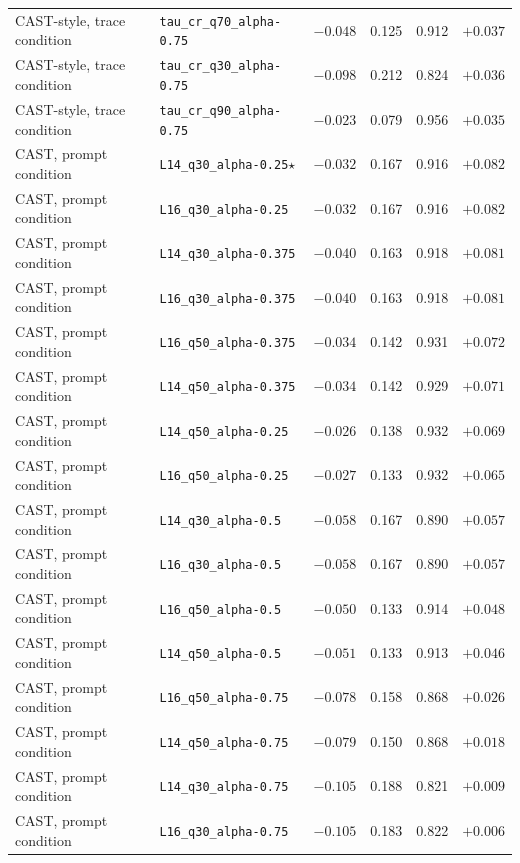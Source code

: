 {\begin{longtable}{l|l|c|cc|c}
CAST-style, trace condition & \texttt{tau\_cr\_q70\_alpha-0.75} & $-0.048$ & 0.125 & 0.912 & $+0.037$ \\
CAST-style, trace condition & \texttt{tau\_cr\_q30\_alpha-0.75} & $-0.098$ & 0.212 & 0.824 & $+0.036$ \\
CAST-style, trace condition & \texttt{tau\_cr\_q90\_alpha-0.75} & $-0.023$ & 0.079 & 0.956 & $+0.035$ \\
CAST, prompt condition & \texttt{L14\_q30\_alpha-0.25}$\star$ & $-0.032$ & 0.167 & 0.916 & $+0.082$ \\
CAST, prompt condition & \texttt{L16\_q30\_alpha-0.25} & $-0.032$ & 0.167 & 0.916 & $+0.082$ \\
CAST, prompt condition & \texttt{L14\_q30\_alpha-0.375} & $-0.040$ & 0.163 & 0.918 & $+0.081$ \\
CAST, prompt condition & \texttt{L16\_q30\_alpha-0.375} & $-0.040$ & 0.163 & 0.918 & $+0.081$ \\
CAST, prompt condition & \texttt{L16\_q50\_alpha-0.375} & $-0.034$ & 0.142 & 0.931 & $+0.072$ \\
CAST, prompt condition & \texttt{L14\_q50\_alpha-0.375} & $-0.034$ & 0.142 & 0.929 & $+0.071$ \\
CAST, prompt condition & \texttt{L14\_q50\_alpha-0.25} & $-0.026$ & 0.138 & 0.932 & $+0.069$ \\
CAST, prompt condition & \texttt{L16\_q50\_alpha-0.25} & $-0.027$ & 0.133 & 0.932 & $+0.065$ \\
CAST, prompt condition & \texttt{L14\_q30\_alpha-0.5} & $-0.058$ & 0.167 & 0.890 & $+0.057$ \\
CAST, prompt condition & \texttt{L16\_q30\_alpha-0.5} & $-0.058$ & 0.167 & 0.890 & $+0.057$ \\
CAST, prompt condition & \texttt{L16\_q50\_alpha-0.5} & $-0.050$ & 0.133 & 0.914 & $+0.048$ \\
CAST, prompt condition & \texttt{L14\_q50\_alpha-0.5} & $-0.051$ & 0.133 & 0.913 & $+0.046$ \\
CAST, prompt condition & \texttt{L16\_q50\_alpha-0.75} & $-0.078$ & 0.158 & 0.868 & $+0.026$ \\
CAST, prompt condition & \texttt{L14\_q50\_alpha-0.75} & $-0.079$ & 0.150 & 0.868 & $+0.018$ \\
CAST, prompt condition & \texttt{L14\_q30\_alpha-0.75} & $-0.105$ & 0.188 & 0.821 & $+0.009$ \\
CAST, prompt condition & \texttt{L16\_q30\_alpha-0.75} & $-0.105$ & 0.183 & 0.822 & $+0.006$ \\

\end{longtable}}
